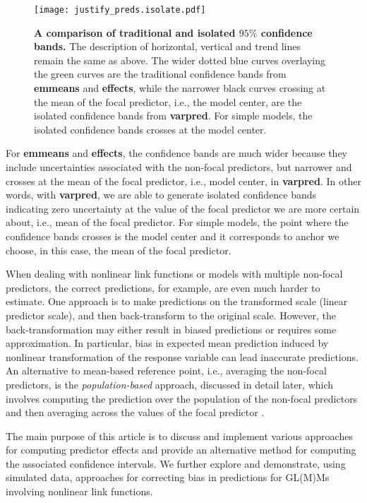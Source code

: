 \documentclass[10pt,letterpaper]{article}
\newcommand{\pkg}[1]{\textbf{#1}}
\begin{document}
\begin{figure}[!h]
\centering
\texttt{[image: justify\_preds.isolate.pdf]}
\caption{{\bf A comparison of traditional and isolated $95\%$ confidence bands.} The description of horizontal, vertical and trend lines remain the same as above. The wider dotted blue curves overlaying the green curves are the traditional confidence bands from \pkg{emmeans} and \pkg{effects}, while the narrower black curves crossing at the mean of the focal predictor, i.e., the model center, are the isolated confidence bands from \pkg{varpred}. For simple models, the isolated confidence bands crosses at the model center.}
\label{fig:justify_ci_plots}
\end{figure}

For \pkg{emmeans} and \pkg{effects}, the confidence bands are much wider because they include uncertainties associated with the non-focal predictors, but narrower and crosses at the mean of the focal predictor, i.e., model center, in \pkg{varpred}. In other words, with \pkg{varpred}, we are able to generate isolated confidence bands indicating zero uncertainty at the value of the focal predictor we are more certain about, i.e., mean of the focal predictor. For simple models, the point where the confidence bands crosses is the model center and it corresponds to anchor we choose, in this case, the mean of the focal predictor.


When dealing with nonlinear link functions or models with multiple non-focal predictors, the correct predictions, for example, are even much harder to estimate. One approach is to make predictions on the transformed scale (linear predictor scale), and then back-transform to the original scale. However, the back-transformation may either result in biased predictions or requires some approximation. In particular, bias in expected mean prediction induced by nonlinear transformation of the response variable can lead inaccurate predictions. An alternative to mean-based reference point, i.e., averaging the non-focal predictors, is the \emph{population-based} approach, discussed in detail later, which involves computing the prediction over the population of the non-focal predictors and then averaging across the values of the focal predictor \cite{hanmer2013behind}. 


The main purpose of this article is to discuss and implement various approaches for computing predictor effects and provide an alternative method for computing the associated confidence intervals. We further explore and demonstrate, using simulated data, approaches for correcting bias in predictions for GL(M)Ms involving nonlinear link functions.
\end{document}
